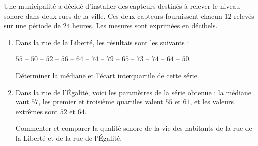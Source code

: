 Une municipalité a décidé d'installer des capteurs destinés à relever le niveau sonore dans deux rues de la ville. Ces deux capteurs fournissent chacun $12$ relevés sur une période de $24$ heures. Les mesures sont exprimées en décibels.
\begin{enumerate}
\item Dans la rue de la Liberté, les résultats sont les suivants :
\begin{center}
$55$ -- $50$ -- $52$ -- $56$ -- $64$ -- $74$ -- $79$ -- $65$ -- $73$ -- $74$ -- $64$ -- $50$.
\end{center}
Déterminer la médiane et l'écart interquartile de cette série.
\item Dans la rue de l'Égalité, voici les paramètres de la série obtenue : la médiane vaut $57$, les premier et troisième quartiles valent $55$ et $61$, et les valeurs extrêmes sont $52$ et $64$.

Commenter et comparer la qualité sonore de la vie des habitants de la rue de la Liberté et de la rue de l'Égalité.
\end{enumerate}

